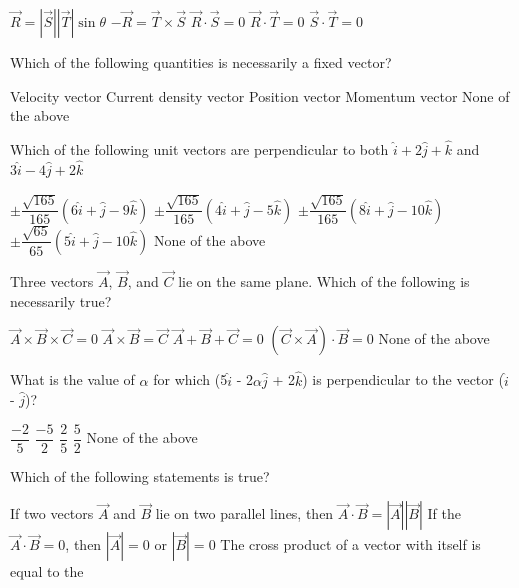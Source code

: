 \documentclass[12pt,addpoints]{exam}
\begin{document}
{{{\begin{questions}
\begin{oneparchoices}
						\choice $\vec{R}=|\vec{S}||\vec{T}|\sin\theta$
						\choice $-\vec{R}=\vec{T}\times\vec{S}$
						\choice $\vec{R}\cdot\vec{S}=0$
						\choice $\vec{R}\cdot\vec{T}=0$
						\choice $\vec{S}\cdot\vec{T}=0$
					\end{oneparchoices}
					\question Which of the following quantities is necessarily a fixed vector? \\
					\begin{oneparchoices}
						\choice Velocity vector
						\choice Current density vector
						\choice Position vector
						\choice Momentum vector
						\choice None of the above
					\end{oneparchoices}
					\question Which of the following unit vectors are perpendicular to both $\hat{i}+2\hat{j}+\hat{k}$ and $3\hat{i}-4\hat{j}+2\hat{k}$
					\begin{oneparchoices}
						\choice $\pm\dfrac{\sqrt{165}}{165}(6\hat{i}+\hat{j}-9\hat{k})$
						\choice $\pm\dfrac{\sqrt{165}}{165}(4\hat{i}+\hat{j}-5\hat{k})$
						\choice $\pm\dfrac{\sqrt{165}}{165}(8\hat{i}+\hat{j}-10\hat{k})$
						\choice $\pm\dfrac{\sqrt{65}}{65}(5\hat{i}+\hat{j}-10\hat{k})$
						\choice None of the above
					\end{oneparchoices}
					\question Three vectors $\vec{A}$, $\vec{B}$, and $\vec{C}$ lie on the same plane. Which of the following is necessarily true?
					\begin{oneparchoices}
						\choice $\vec{A}\times\vec{B}\times\vec{C}=0$
						\choice $\vec{A}\times\vec{B}=\vec{C}$
						\choice $\vec{A}+\vec{B}+\vec{C}=0$
						\choice $(\vec{C}\times\vec{A})\cdot\vec{B}=0$
						\choice None of the above
					\end{oneparchoices}
					\question What is the value of $\alpha$ for which (5$\hat{i}$ - 2$\alpha$$\hat{j}$ + 2$\hat{k}$) is perpendicular to the vector ($\hat{i}$ - $\hat{j}$)? \\
					\begin{oneparchoices}
						\choice $\dfrac{-2}{5}$
						\choice $\dfrac{-5}{2}$
						\choice $\dfrac{2}{5}$
						\choice $\dfrac{5}{2}$
						\choice None of the above
					\end{oneparchoices} 
					\question Which of the following statements is true?
					\begin{choices}
						\choice If two vectors $\vec{A}$ and $\vec{B}$ lie on two parallel lines, then $\vec{A}\cdot\vec{B}=|\vec{A}||\vec{B}|$
						\choice If the $\vec{A}\cdot\vec{B}=0$, then $|\vec{A}|=0$ or $|\vec{B}|=0$
						\choice The cross product of a vector with itself is equal to the

\end{choices}$$
\end{questions}}}}
\end{document}
